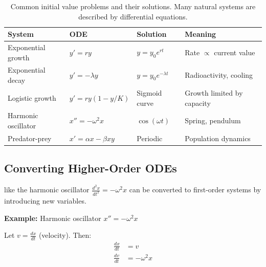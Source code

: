 
\begin{table}[ht]
\centering
\begin{tabular}{p{}p{}p{}p{}}
\toprule
\textbf{System} & \textbf{ODE} & \textbf{Solution} & \textbf{Meaning} \\
\midrule
Exponential growth & $y' = ry$ & $y = y_0 e^{rt}$ & Rate $\propto$ current value \\
Exponential decay & $y' = -\lambda y$ & $y = y_0 e^{-\lambda t}$ & Radioactivity, cooling \\
Logistic growth & $y' = ry(1 - y/K)$ & Sigmoid curve & Growth limited by capacity \\
Harmonic oscillator & $x'' = -\omega^2 x$ & $\cos(\omega t)$ & Spring, pendulum \\
Predator-prey & $x' = \alpha x - \beta xy$ & Periodic & Population dynamics \\
\bottomrule
\end{tabular}
\vspace{2em}
\caption{Common initial value problems and their solutions. Many natural systems are described by differential equations.}
\label{tab:ivp_examples}
\end{table}



\subsection{Converting Higher-Order ODEs}

 like the harmonic oscillator $\frac{d^2x}{dt^2} = -\omega^2 x$ can be converted to first-order systems by introducing new variables.

\textbf{Example:} Harmonic oscillator $x'' = -\omega^2 x$

Let $v = \frac{dx}{dt}$ (velocity). Then:
\begin{align}
    \frac{dx}{dt} &= v \\
    \frac{dv}{dt} &= -\omega^2 x
\end{align}


